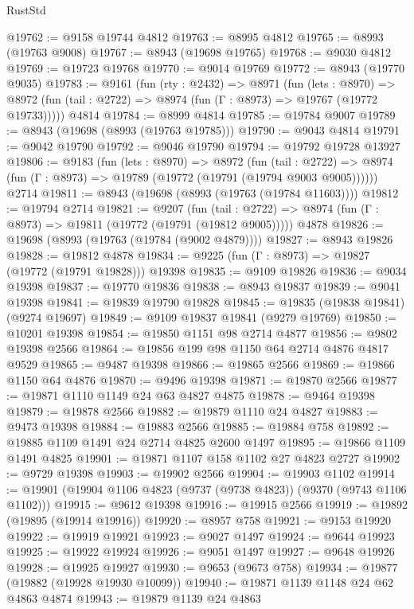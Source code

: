 \begin{lexlean}{RustStd}
\begin{coremodule}
{\begin{coremodule}
{{{{{{{{{{{{{{{{{{{{{{{{{{{{{{{{{{{{{{{@19762 := @9158 @19744 @4812
@19763 := @8995 @4812
@19765 := @8993 (@19763 @9008)
@19767 := @8943 (@19698 @19765)
@19768 := @9030 @4812
@19769 := @19723 @19768
@19770 := @9014 @19769
@19772 := @8943 (@19770 @9035)
@19783 := @9161
    (fun (rty : @2432) =>
    @8971
      (fun (lets : @8970) =>
      @8972 (fun (tail : @2722) => @8974 (fun (Γ : @8973) => @19767 (@19772 @19733)))))
    @4814
@19784 := @8999 @4814
@19785 := @19784 @9007
@19789 := @8943 (@19698 (@8993 (@19763 @19785)))
@19790 := @9043 @4814
@19791 := @9042 @19790
@19792 := @9046 @19790
@19794 := @19792 @19728 @13927
@19806 := @9183
    (fun (lets : @8970) =>
    @8972
      (fun (tail : @2722) =>
      @8974 (fun (Γ : @8973) => @19789 (@19772 (@19791 (@19794 @9003 @9005))))))
    @2714
@19811 := @8943 (@19698 (@8993 (@19763 (@19784 @11603))))
@19812 := @19794 @2714
@19821 := @9207
    (fun (tail : @2722) => @8974 (fun (Γ : @8973) => @19811 (@19772 (@19791 (@19812 @9005)))))
    @4878
@19826 := @19698 (@8993 (@19763 (@19784 (@9002 @4879))))
@19827 := @8943 @19826
@19828 := @19812 @4878
@19834 := @9225 (fun (Γ : @8973) => @19827 (@19772 (@19791 @19828))) @19398
@19835 := @9109 @19826
@19836 := @9034 @19398
@19837 := @19770 @19836
@19838 := @8943 @19837
@19839 := @9041 @19398
@19841 := @19839 @19790 @19828
@19845 := @19835 (@19838 @19841) (@9274 @19697)
@19849 := @9109 @19837 @19841 (@9279 @19769)
@19850 := @10201 @19398
@19854 := @19850 @1151 @98 @2714 @4877
@19856 := @9802 @19398 @2566
@19864 := @19856 @199 @98 @1150 @64 @2714 @4876 @4817 @9529
@19865 := @9487 @19398
@19866 := @19865 @2566
@19869 := @19866 @1150 @64 @4876
@19870 := @9496 @19398
@19871 := @19870 @2566
@19877 := @19871 @1110 @1149 @24 @63 @4827 @4875
@19878 := @9464 @19398
@19879 := @19878 @2566
@19882 := @19879 @1110 @24 @4827
@19883 := @9473 @19398
@19884 := @19883 @2566
@19885 := @19884 @758
@19892 := @19885 @1109 @1491 @24 @2714 @4825 @2600 @1497
@19895 := @19866 @1109 @1491 @4825
@19901 := @19871 @1107 @158 @1102 @27 @4823 @2727
@19902 := @9729 @19398
@19903 := @19902 @2566
@19904 := @19903 @1102
@19914 := @19901 (@19904 @1106 @4823 (@9737 (@9738 @4823)) (@9370 (@9743 @1106 @1102)))
@19915 := @9612 @19398
@19916 := @19915 @2566
@19919 := @19892 (@19895 (@19914 @19916))
@19920 := @8957 @758
@19921 := @9153 @19920
@19922 := @19919 @19921
@19923 := @9027 @1497
@19924 := @9644 @19923
@19925 := @19922 @19924
@19926 := @9051 @1497
@19927 := @9648 @19926
@19928 := @19925 @19927
@19930 := @9653 (@9673 @758)
@19934 := @19877 (@19882 (@19928 @19930 @10099))
@19940 := @19871 @1139 @1148 @24 @62 @4863 @4874
@19943 := @19879 @1139 @24 @4863
}}}}}}}}}}}}}}}}}}}}}}}}}}}}}}}}}}}}}}}
\end{coremodule}}
\end{coremodule}
\end{lexlean}
